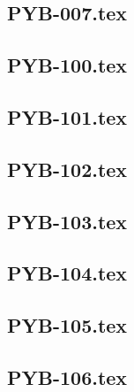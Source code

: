 \renewcommand{\xxexo}{PYB-007.tex} 
\subsection*{\xxexo} 
\graphicspath{{../../exos/python_bases/PYB-007/}}
 
 
\renewcommand{\xxexo}{PYB-100.tex} 
\subsection*{\xxexo} 
\graphicspath{{../../exos/python_bases/PYB-100/}}
 
 
\renewcommand{\xxexo}{PYB-101.tex} 
\subsection*{\xxexo} 
\graphicspath{{../../exos/python_bases/PYB-101/}}
 
 
\renewcommand{\xxexo}{PYB-102.tex} 
\subsection*{\xxexo} 
\graphicspath{{../../exos/python_bases/PYB-102/}}
 
 
\renewcommand{\xxexo}{PYB-103.tex} 
\subsection*{\xxexo} 
\graphicspath{{../../exos/python_bases/PYB-103/}}
 
 
\renewcommand{\xxexo}{PYB-104.tex} 
\subsection*{\xxexo} 
\graphicspath{{../../exos/python_bases/PYB-104/}}
 
 
\renewcommand{\xxexo}{PYB-105.tex} 
\subsection*{\xxexo} 
\graphicspath{{../../exos/python_bases/PYB-105/}}
 
 
\renewcommand{\xxexo}{PYB-106.tex} 
\subsection*{\xxexo} 
\graphicspath{{../../exos/python_bases/PYB-106/}}
 
 
